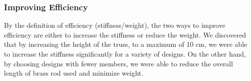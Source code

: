 \subsubsection{Improving Efficiency}

By the definition of efficiency (stiffness/weight), the two ways to improve efficiency are either to increase the stiffness or reduce the weight.  We discovered that by increasing the height of the truss, to a maximum of 10 cm, we were able to increase the stiffness significantly for a variety of designs. On the other hand, by choosing designs with fewer members, we were able to reduce the overall length of brass rod used and minimize weight.  

